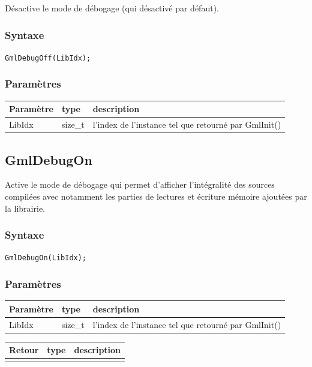\documentclass[a4paper,12pt]{article}
\begin{document}
Désactive le mode de débogage (qui désactivé par défaut).

\subsubsection*{Syntaxe}

{\tt GmlDebugOff(LibIdx);}
\subsubsection*{Paramètres}

\begin{tabular}{|m{2cm}|m{1.5cm}|m{10.5cm}|}
\hline
Paramètre  & type    & description \\
\hline
LibIdx     & size\_t & l'index de l'instance tel que retourné par GmlInit() \\
\hline
\end{tabular}


\subsection{GmlDebugOn}

Active le mode de débogage qui permet d'afficher l'intégralité des sources compilées avec notamment les parties de lectures et écriture mémoire ajoutées par la librairie.

\subsubsection*{Syntaxe}

{\tt GmlDebugOn(LibIdx);}

\subsubsection*{Paramètres}

\begin{tabular}{|m{2cm}|m{1.5cm}|m{10.5cm}|}
\hline
Paramètre  & type    & description \\
\hline
LibIdx     & size\_t & l'index de l'instance tel que retourné par GmlInit() \\
\hline
\end{tabular}

\medskip

\begin{tabular}{|m{2cm}|m{1.5cm}|m{10.5cm}|}
\hline
Retour     & type   & description \\
\hline
 & & \\
\hline
\end{tabular}
\end{document}
